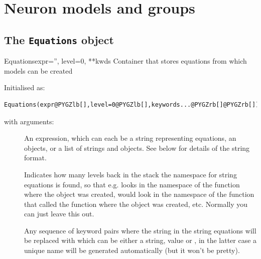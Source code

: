 \documentclass[letterpaper,10pt,english]{manual}
\begin{document}
\resetcurrentobjects
\hypertarget{--doc-reference-models-and-groups}{}

\hypertarget{index-124}{}\section{Neuron models and groups}

\hypertarget{index-125}{}\subsection{The \texttt{Equations} object}

\hypertarget{brian.Equations}{}\begin{classdesc}{Equations}{expr='', level=0, **kwds}
Container that stores equations from which models can be created

Initialised as:

\begin{Verbatim}[commandchars=@\[\]]
Equations(expr@PYGZlb[],level=0@PYGZlb[],keywords...@PYGZrb[]@PYGZrb[])
\end{Verbatim}

with arguments:
\begin{description}
\item[]
An expression, which can each be a string representing equations,
an \hyperlink{brian.Equations}{} objects, or a list of strings and \hyperlink{brian.Equations}{} objects.
See below for details of the string format.

\item[]
Indicates how many levels back in the stack the namespace for string
equations is found, so that e.g.  looks in the
namespace of the function where the \hyperlink{brian.Equations}{} object was created,
 would look in the namespace of the function that called the
function where the \hyperlink{brian.Equations}{} object was created, etc.
Normally you can just leave this out.

\item[]
Any sequence of keyword pairs  where the string 
in the string equations will be replaced with  which can
be either a string, value or , in the latter case a unique
name will be generated automatically (but it won't be pretty).


\end{description}
\end{classdesc}
\end{document}
